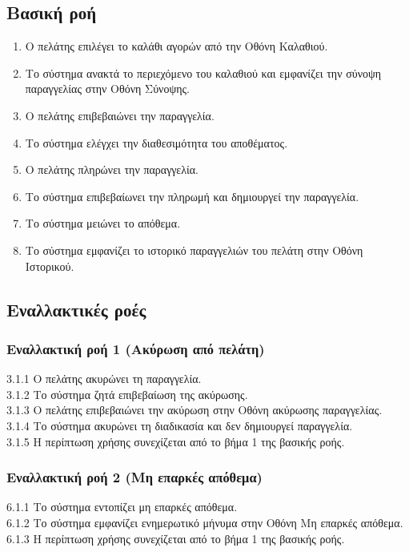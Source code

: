 \documentclass[12pt,a4paper,twoside]{book}
\begin{document}
\subsection{Βασική ροή}
\begin{enumerate}
    \item Ο πελάτης επιλέγει το καλάθι αγορών από την Οθόνη Καλαθιού.
    \item Το σύστημα ανακτά το περιεχόμενο του καλαθιού και εμφανίζει την σύνοψη παραγγελίας στην Οθόνη Σύνοψης.
    \item Ο πελάτης επιβεβαιώνει την παραγγελία.
    \item Το σύστημα ελέγχει την διαθεσιμότητα του αποθέματος.
    \item Ο πελάτης πληρώνει την παραγγελία.
    \item Το σύστημα επιβεβαίωνει την πληρωμή και δημιουργεί την παραγγελία.
    \item Το σύστημα μειώνει το απόθεμα.
    \item Το σύστημα εμφανίζει το ιστορικό παραγγελιών του πελάτη στην Οθόνη Ιστορικού.
\end{enumerate}

\subsection{Εναλλακτικές ροές}

\subsubsection*{Εναλλακτική ροή 1 (Ακύρωση από πελάτη)}
3.1.1 Ο πελάτης ακυρώνει τη παραγγελία.\\
\hspace*{\parindent}3.1.2 Το σύστημα ζητά επιβεβαίωση της ακύρωσης.\\
\hspace*{\parindent}3.1.3 Ο πελάτης επιβεβαιώνει την ακύρωση στην Οθόνη ακύρωσης παραγγελίας.\\
\hspace*{\parindent}3.1.4 Το σύστημα ακυρώνει τη διαδικασία και δεν δημιουργεί παραγγελία.\\
\hspace*{\parindent}3.1.5 Η περίπτωση χρήσης συνεχίζεται από το βήμα 1 της βασικής ροής.

\subsubsection*{Εναλλακτική ροή 2 (Μη επαρκές απόθεμα)}
6.1.1 Το σύστημα εντοπίζει μη επαρκές απόθεμα.\\
\hspace*{\parindent}6.1.2 Το σύστημα εμφανίζει ενημερωτικό μήνυμα στην Οθόνη Μη επαρκές απόθεμα.\\
\hspace*{\parindent}6.1.3 Η περίπτωση χρήσης συνεχίζεται από το βήμα 1 της βασικής ροής.
\end{document}
